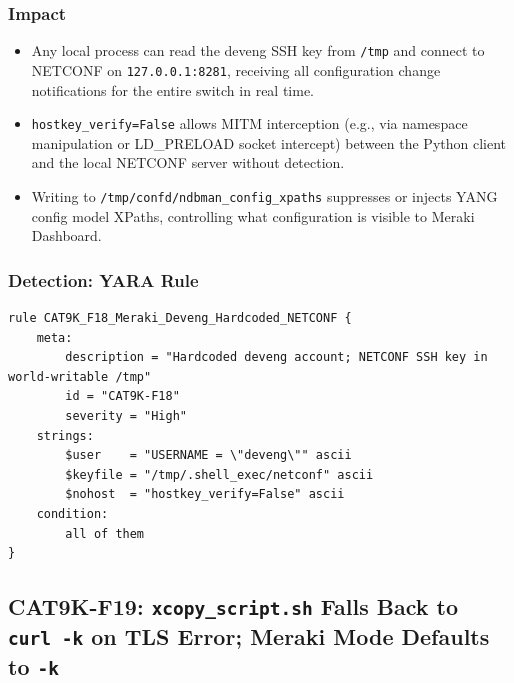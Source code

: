 \documentclass[11pt,a4paper]{article}
\begin{document}
\subsubsection{Impact}

\begin{itemize}[nosep]
  \item Any local process can read the deveng SSH key from \texttt{/tmp} and connect to
    NETCONF on \texttt{127.0.0.1:8281}, receiving all configuration change notifications
    for the entire switch in real time.
  \item \texttt{hostkey\_verify=False} allows MITM interception (e.g., via namespace
    manipulation or LD\_PRELOAD socket intercept) between the Python client and the
    local NETCONF server without detection.
  \item Writing to \texttt{/tmp/confd/ndbman\_config\_xpaths} suppresses or injects
    YANG config model XPaths, controlling what configuration is visible to Meraki Dashboard.
\end{itemize}

\subsubsection{Detection: YARA Rule}

\begin{lstlisting}[style=yara]
rule CAT9K_F18_Meraki_Deveng_Hardcoded_NETCONF {
    meta:
        description = "Hardcoded deveng account; NETCONF SSH key in world-writable /tmp"
        id = "CAT9K-F18"
        severity = "High"
    strings:
        $user    = "USERNAME = \"deveng\"" ascii
        $keyfile = "/tmp/.shell_exec/netconf" ascii
        $nohost  = "hostkey_verify=False" ascii
    condition:
        all of them
}
\end{lstlisting}

\subsection{CAT9K-F19: \texorpdfstring{\texttt{xcopy\_script.sh}}{xcopy\_script.sh} Falls Back to \texttt{curl~-k} on TLS Error; Meraki Mode Defaults to \texttt{-k}}
\end{document}
